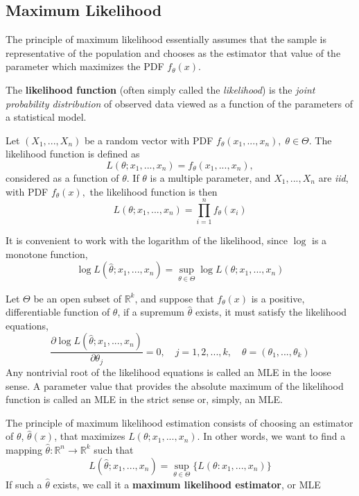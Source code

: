 \documentclass{tufte-handout}
\begin{document}
\subsection{Maximum Likelihood}%
  \label{sub:Maximum Likelihood}
  The principle of maximum likelihood essentially assumes that the sample is representative
of the population and chooses as the estimator that value of the parameter
which maximizes the PDF $f_\theta(x)$. 
\begin{definition}
  The \textbf{likelihood function} (often simply called the \textit{likelihood}) is the \textit{joint probability distribution} of observed data viewed as a function of the parameters of a statistical model.

  Let $(X_1,...,X_n)$ be a random vector with PDF $f_\theta(x_1,...,x_n), \; \theta \in \Theta$. The likelihood function is defined as
  $$L (\theta ; x_1,..., x_n) = f_ \theta (x_1,..., x_n) ,$$
  considered as a function of $\theta$. If $\theta$ is a multiple parameter, and $X_1,...,X_n$ are \textit{iid}, with PDF $f_\theta (x),$ the likelihood function is then 
  $$L(\theta; x_1,..., x_n) =\prod^{n}_{i=1} f_\theta (x_i) $$
\end{definition}
\begin{definition}
  It is convenient to work with the logarithm of the likelihood, since $\log$ is a monotone function, 
  $$\log L(\hat \theta ; x_1,..., x_n) = \sup_{\theta \in \Theta}\log L(\theta; x_1,..., x_n) $$
\end{definition}
\begin{proposition} \label{label}
  Let $\Theta$ be an open subset of $\mathbb{R}^k$, and suppose that $f_\theta (x)$ is a positive, differentiable function of $\theta $, if a supremum $\hat \theta$ exists, it must satisfy the likelihood equations, 
  $$\frac{\partial \log L(\hat \theta ; x_1, ..., x_n )}{\partial \theta_j} = 0 , \quad j = 1,2,...,k, \quad \theta = (\theta_1, ..., \theta_k) $$
  Any nontrivial root of the likelihood equations is called an MLE in the loose
sense. A parameter value that provides the absolute maximum of the likelihood function
is called an MLE in the strict sense or, simply, an MLE.
\end{proposition}
\begin{definition}
  The principle of maximum likelihood estimation consists of choosing an estimator of $\theta$, $\hat \theta (x)$, that maximizes $L(\theta ; x_1,..., x_n)$. In other words, we want to find a mapping $\hat \theta : \mathbb{R}^n \to \mathbb{R}^k$ such that 
  $$L (\hat \theta ; x_1,..., x_n ) = \sup_{\theta \in \Theta}\{L(\theta : x_1,..., x_n)\} $$
  If such a $\hat \theta$ exists, we call it a \textbf{maximum likelihood estimator}, or MLE 
\end{definition}
\end{document}
